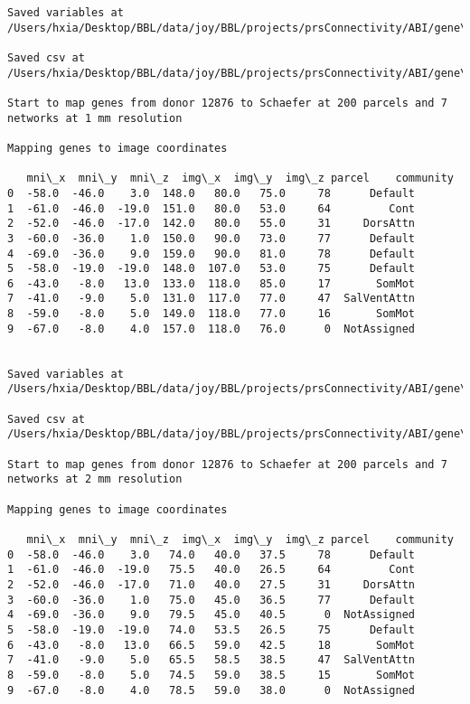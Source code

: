 \documentclass[11pt]{article}
\begin{document}
\begin{Verbatim}[commandchars=\\\{\}]
Saved variables at /Users/hxia/Desktop/BBL/data/joy/BBL/projects/prsConnectivity/ABI/gene\_mapping/12876donor\_100Parcels\_17Network\_2mm.pkl

Saved csv at /Users/hxia/Desktop/BBL/data/joy/BBL/projects/prsConnectivity/ABI/gene\_mapping/12876donor\_100Parcels\_17Network\_2mm.csv

Start to map genes from donor 12876 to Schaefer at 200 parcels and 7 networks at 1 mm resolution

Mapping genes to image coordinates

   mni\_x  mni\_y  mni\_z  img\_x  img\_y  img\_z parcel    community
0  -58.0  -46.0    3.0  148.0   80.0   75.0     78      Default
1  -61.0  -46.0  -19.0  151.0   80.0   53.0     64         Cont
2  -52.0  -46.0  -17.0  142.0   80.0   55.0     31     DorsAttn
3  -60.0  -36.0    1.0  150.0   90.0   73.0     77      Default
4  -69.0  -36.0    9.0  159.0   90.0   81.0     78      Default
5  -58.0  -19.0  -19.0  148.0  107.0   53.0     75      Default
6  -43.0   -8.0   13.0  133.0  118.0   85.0     17       SomMot
7  -41.0   -9.0    5.0  131.0  117.0   77.0     47  SalVentAttn
8  -59.0   -8.0    5.0  149.0  118.0   77.0     16       SomMot
9  -67.0   -8.0    4.0  157.0  118.0   76.0      0  NotAssigned


Saved variables at /Users/hxia/Desktop/BBL/data/joy/BBL/projects/prsConnectivity/ABI/gene\_mapping/12876donor\_200Parcels\_7Network\_1mm.pkl

Saved csv at /Users/hxia/Desktop/BBL/data/joy/BBL/projects/prsConnectivity/ABI/gene\_mapping/12876donor\_200Parcels\_7Network\_1mm.csv

Start to map genes from donor 12876 to Schaefer at 200 parcels and 7 networks at 2 mm resolution

Mapping genes to image coordinates

   mni\_x  mni\_y  mni\_z  img\_x  img\_y  img\_z parcel    community
0  -58.0  -46.0    3.0   74.0   40.0   37.5     78      Default
1  -61.0  -46.0  -19.0   75.5   40.0   26.5     64         Cont
2  -52.0  -46.0  -17.0   71.0   40.0   27.5     31     DorsAttn
3  -60.0  -36.0    1.0   75.0   45.0   36.5     77      Default
4  -69.0  -36.0    9.0   79.5   45.0   40.5      0  NotAssigned
5  -58.0  -19.0  -19.0   74.0   53.5   26.5     75      Default
6  -43.0   -8.0   13.0   66.5   59.0   42.5     18       SomMot
7  -41.0   -9.0    5.0   65.5   58.5   38.5     47  SalVentAttn
8  -59.0   -8.0    5.0   74.5   59.0   38.5     15       SomMot
9  -67.0   -8.0    4.0   78.5   59.0   38.0      0  NotAssigned



\end{Verbatim}
\end{document}
